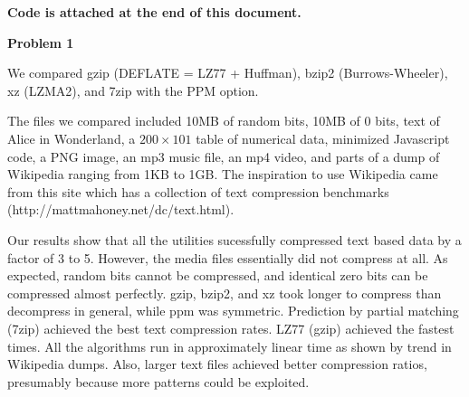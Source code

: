 \documentclass[11pt]{article}
\begin{document}

\medskip

\noindent \textbf{Code is attached at the end of this document.}

\medskip

\noindent \textbf{Problem 1}

We compared gzip (DEFLATE = LZ77 + Huffman), bzip2 (Burrows-Wheeler), xz (LZMA2), and 7zip with the PPM option.

The files we compared included 10MB of random bits, 10MB of 0 bits, text of Alice in Wonderland, a $200 \times 101$ table of numerical data, minimized Javascript code, a PNG image, an mp3 music file, an mp4 video, and parts of a dump of Wikipedia ranging from 1KB to 1GB.  The inspiration to use Wikipedia came from this site which has a collection of text compression benchmarks (http://mattmahoney.net/dc/text.html).

Our results show that all the utilities sucessfully compressed text based data by a factor of 3 to 5.  However, the media files essentially did not compress at all.  As expected, random bits cannot be compressed, and identical zero bits can be compressed almost perfectly.  gzip, bzip2, and xz took longer to compress than decompress in general, while ppm was symmetric.  Prediction by partial matching (7zip) achieved the best text compression rates.  LZ77 (gzip) achieved the fastest times.  All the algorithms run in approximately linear time as shown by trend in Wikipedia dumps.  Also, larger text files achieved better compression ratios, presumably because more patterns could be exploited.
\end{document}
